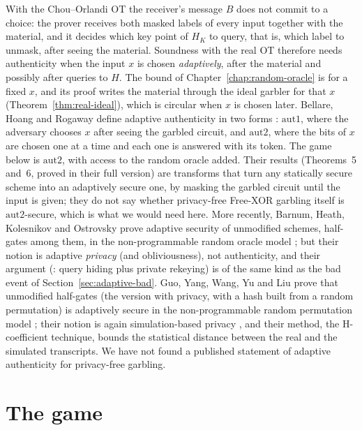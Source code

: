 With the Chou--Orlandi OT the receiver's message $B$ does not commit to a choice: the prover
receives both masked labels of every input together with the material, and it decides which key
point of $H_K$ to query, that is, which label to unmask, after seeing the material. Soundness with
the real OT therefore needs authenticity when the input $x$ is chosen \emph{adaptively}, after the
material and possibly after queries to $H$. The bound of Chapter~\ref{chap:random-oracle} is for a
fixed $x$, and its proof writes the material through the ideal garbler for that $x$
(Theorem~\ref{thm:real-ideal}), which is circular when $x$ is chosen later. Bellare, Hoang and
Rogaway \cite{BHR12} define adaptive authenticity in two forms \cite[Sect.~4, Fig.~6]{BHR12}:
$\mathrm{aut1}$, where the adversary chooses $x$ after seeing the garbled circuit, and
$\mathrm{aut2}$, where the bits of $x$ are chosen one at a time and each one is answered with its
token. The game below is $\mathrm{aut2}$, with access to the random oracle added. Their results
(Theorems~5 and~6, proved in their full version) are transforms that turn any statically secure
scheme into an adaptively secure one, by masking the garbled circuit until the input is given;
they do not say whether privacy-free Free-XOR garbling itself is $\mathrm{aut2}$-secure, which is
what we would need here. More recently, Barnum, Heath, Kolesnikov and Ostrovsky prove adaptive
security of unmodified schemes, half-gates among them, in the non-programmable random oracle model
\cite{BHKO26}; but their notion is adaptive \emph{privacy} \cite[Definition~5]{BHKO26} (and
obliviousness), not authenticity, and their argument (\cite[Theorem~9]{BHKO26}: query hiding plus
private rekeying) is of the same kind as the bad event of Section~\ref{sec:adaptive-bad}. Guo, Yang, Wang, Yu and Liu prove
that unmodified half-gates (the version with privacy, with a hash built from a random permutation) is
adaptively secure in the non-programmable random permutation model \cite[Sect.~5,
Theorem~1]{GYWYL}; their notion is again simulation-based privacy \cite[Definition~1]{GYWYL},
and their method, the H-coefficient technique, bounds the statistical distance between the real and
the simulated transcripts. We have not found a published
statement of adaptive authenticity for privacy-free garbling.

\section{The game}

